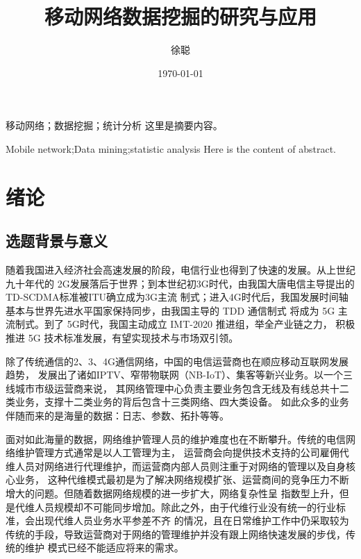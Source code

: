 \documentclass{HustGraduPaper}
\title{移动网络数据挖掘的研究与应用}
\author{徐聪}
\date{\today}
\begin{document}
    \maketitle
    \statement
    \clearpage

    \begin{cnabstract}{移动网络；数据挖掘；统计分析}
        这里是摘要内容。
    \end{cnabstract}
    \begin{enabstract}{Mobile network;Data mining;statistic analysis}
        Here is the content of abstract.
    \end{enabstract}

    \tableofcontents
    \clearpage

    \section{绪论}
    
    \subsection{选题背景与意义}

    随着我国进入经济社会高速发展的阶段，电信行业也得到了快速的发展。从上世纪九十年代的
    2G发展落后于世界；到本世纪初3G时代，由我国大唐电信主导提出的TD-SCDMA标准被ITU确立成为3G主流
    制式；进入4G时代后，我国发展时间轴基本与世界先进水平国家保持同步，由我国主导的 TDD 通信制式
    将成为 5G 主流制式。到了 5G时代，我国主动成立 IMT-2020 推进组，举全产业链之力，
    积极推进 5G 技术标准发展，有望实现技术与市场双引领。
    
    除了传统通信的2、3、4G通信网络，中国的电信运营商也在顺应移动互联网发展趋势，
    发展出了诸如IPTV、窄带物联网（NB-IoT）、集客等新兴业务。以一个三线城市市级运营商来说，
    其网络管理中心负责主要业务包含无线及有线总共十二类业务，支撑十二类业务的背后包含十三类网络、四大类设备。
    如此众多的业务伴随而来的是海量的数据：日志、参数、拓扑等等。

    面对如此海量的数据，网络维护管理人员的维护难度也在不断攀升。传统的电信网络维护管理方式通常是以人工管理为主，
    运营商会向提供技术支持的公司雇佣代维人员对网络进行代理维护，而运营商内部人员则注重于对网络的管理以及自身核心业务，
    这种代维模式最初是为了解决网络规模扩张、运营商间的竞争压力不断增大的问题。但随着数据网络规模的进一步扩大，网络复杂性呈
    指数型上升，但是代维人员规模却不可能同步增加。除此之外，由于代维行业没有统一的行业标准，会出现代维人员业务水平参差不齐
    的情况，且在日常维护工作中仍采取较为传统的手段，导致运营商对于网络的管理维护并没有跟上网络快速发展的步伐，传统的维护
    模式已经不能适应将来的需求。
\end{document}
